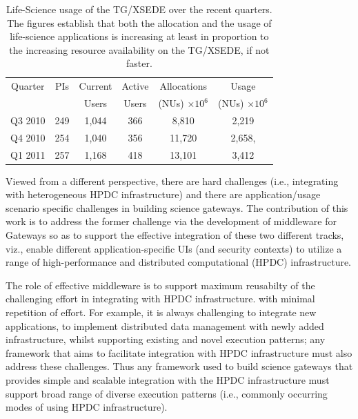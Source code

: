 \documentclass[]{svjour3}
\begin{document}
\begin{table}
\centering
 \small
\begin{tabular}{|c|c|c|c|c|c|} 
  \hline  Quarter & PIs & Current & Active & Allocations  & Usage\\
  & & Users  &  Users & (NUs) $\times 10^6$& (NUs) $\times 10^6$ \\ \hline
  Q3 2010 & 249 & 1,044 & 366 & 8,810   & 2,219  \\ \hline
  Q4 2010 & 254 & 1,040 & 356 & 11,720  & 2,658, \\ \hline
  Q1 2011 & 257 & 1,168 & 418 & 13,101  & 3,412\\ \hline 
\end{tabular} 
\caption{Life-Science usage of the TG/XSEDE over the recent
  quarters. The figures establish that both the  allocation and the
  usage of life-science applications is increasing at least in
  proportion to the increasing resource availability on the TG/XSEDE,
  if not faster.}
 \label{tg2011} 
\end{table}





Viewed from a different perspective, there are hard challenges (i.e.,
integrating with heterogeneous HPDC infrastructure) and there are
application/usage scenario specific challenges in building science gateways. The
contribution of this work is to address the former challenge via the
development of middleware for Gateways so as to support the effective
integration of these two different tracks, viz., enable different
application-specific UIs (and security contexts) to utilize a range of
high-performance and distributed computational (HPDC) infrastructure.

The role of effective middleware is to support maximum reusabilty of
the challenging effort in integrating with HPDC infrastructure.  with
minimal repetition of effort.  For example, it is always challenging
to integrate new applications, to implement distributed data
management with newly added infrastructure, whilst supporting existing
and novel execution patterns; any framework that aims to facilitate
integration with HPDC infrastructure must also address these
challenges.  Thus any framework used to build science gateways that provides simple
and scalable integration with the HPDC infrastructure must support
broad range of diverse execution patterns (i.e., commonly occurring
modes of using HPDC infrastructure).
\end{document}
